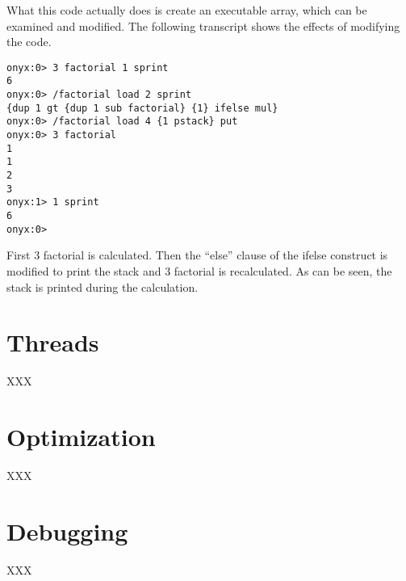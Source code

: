 What this code actually does is create an executable array, which can be
examined and modified.  The following transcript shows the effects of modifying
the code.

\begin{verbatim}
onyx:0> 3 factorial 1 sprint
6
onyx:0> /factorial load 2 sprint
{dup 1 gt {dup 1 sub factorial} {1} ifelse mul}
onyx:0> /factorial load 4 {1 pstack} put
onyx:0> 3 factorial 
1
1
2
3
onyx:1> 1 sprint
6
onyx:0>
\end{verbatim}

First 3 factorial is calculated.  Then the ``else'' clause of the ifelse
construct is modified to print the stack and 3 factorial is recalculated.  As
can be seen, the stack is printed during the calculation.

\section{Threads}
XXX

\section{Optimization}
XXX

\section{Debugging}
XXX
